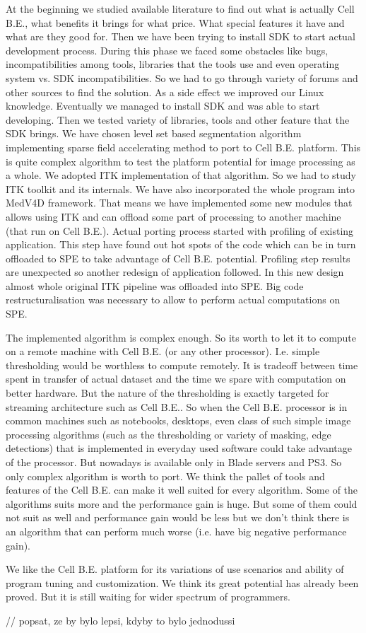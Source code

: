 At the beginning we studied available literature to find out what is actually Cell B.E., what benefits it brings for what price.
What special features it have and what are they good for.
Then we have been trying to install SDK to start actual development process.
During this phase we faced some obstacles like bugs, incompatibilities among tools, libraries that the tools use and even operating system vs. SDK incompatibilities.
So we had to go through variety of forums and other sources to find the solution.
As a side effect we improved our Linux knowledge.
Eventually we managed to install SDK and was able to start developing.
Then we tested variety of libraries, tools and other feature that the SDK brings.
We have chosen level set based segmentation algorithm implementing sparse field accelerating method to port to Cell B.E. platform.
This is quite complex algorithm to test the platform potential for image processing as a whole.
We adopted ITK implementation of that algorithm.
So we had to study ITK toolkit and its internals.
We have also incorporated the whole program into MedV4D framework.
That means we have implemented some new modules that allows using ITK and can offload some part of processing to another machine (that run on Cell B.E.).
Actual porting process started with profiling of existing application.
This step have found out hot spots of the code which can be in turn offloaded to SPE to take advantage of Cell B.E. potential.
Profiling step results are unexpected so another redesign of application followed.
In this new design almost whole original ITK pipeline was offloaded into SPE.
Big code restructuralisation was necessary to allow to perform actual computations on SPE.

\par
The implemented algorithm is complex enough.
So its worth to let it to compute on a remote machine with Cell B.E. (or any other processor).
I.e. simple thresholding would be worthless to compute remotely.
It is tradeoff between time spent in transfer of actual dataset and the time we spare with computation on better hardware.
But the nature of the thresholding is exactly targeted for streaming architecture such as Cell B.E..
So when the Cell B.E. processor is in common machines such as notebooks, desktops, even class of such simple image processing algorithms (such as the thresholding or variety of masking, edge detections) that is implemented in everyday used software could take advantage of the processor.
But nowadays is available only in Blade servers and PS3.
So only complex algorithm is worth to port.
We think the pallet of tools and features of the Cell B.E. can make it well suited for every algorithm.
Some of the algorithms suits more and the performance gain is huge.
But some of them could not suit as well and performance gain would be less but we don't think there is an algorithm that can perform much worse (i.e. have big negative performance gain).

We like the Cell B.E. platform for its variations of use scenarios and ability of program tuning and customization.
We think its great potential has already been proved.
But it is still waiting for wider spectrum of programmers.

// popsat, ze by bylo lepsi, kdyby to bylo jednodussi